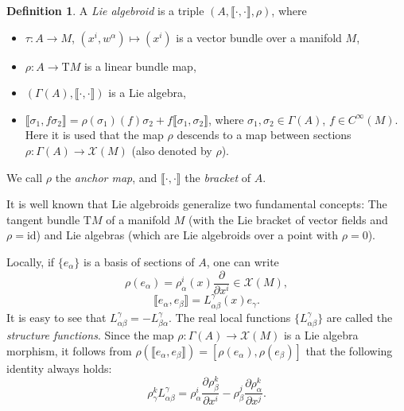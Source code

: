 \documentclass[11pt]{article}
\theoremstyle{plain}
\theoremstyle{definition}
\newtheorem{definition}{Definition}
\begin{document}
\begin{definition}
A \emph{Lie algebroid} is a triple $(A,\llbracket \cdot,\cdot\rrbracket,\rho)$, where
\begin{itemize}
    \item $\tau\colon A\to M$, $(x^i,w^{\alpha})\mapsto (x^i)$ is a vector bundle over a manifold $M$,
    \item $\rho\colon A\to \mathrm{T}M$ is a linear bundle map,
    \item $(\Gamma(A),\llbracket \cdot,\cdot\rrbracket)$ is a Lie algebra,
    \item $\llbracket \sigma_1,f\sigma_2\rrbracket=\rho(\sigma_1)(f)\sigma_2+f\llbracket \sigma_1,\sigma_2\rrbracket$, where $\sigma_1,\sigma_2\in \Gamma(A)$, $f\in C^{\infty}(M)$. Here it is used that the map $\rho$ descends to a map between sections $\rho\colon \Gamma(A)\to \mathcal{X}(M)$ (also denoted by $\rho$).
\end{itemize}
We call $\rho$ the \emph{anchor map}, and $\llbracket \cdot,\cdot\rrbracket$ the \emph{bracket} of $A$.
\end{definition}


It is well known that Lie algebroids generalize two fundamental concepts: The tangent bundle $\mathrm{T}M$ of a manifold $M$ (with the Lie bracket of vector fields and $\rho=\mathrm{id}$) and Lie algebras (which are Lie algebroids over a point with $\rho=0$).

Locally, if $\{e_{\alpha}\}$ is a basis of sections of $A$, one can write
\begin{equation*}
    \rho(e_{\alpha})=\rho_{\alpha}^i(x)\frac{\partial}{\partial x^i}\in \mathcal{X}(M),
\end{equation*}
\begin{equation*}
    \llbracket e_{\alpha},e_{\beta}\rrbracket=L_{\alpha \beta}^{\gamma}(x)e_{\gamma}.
\end{equation*}
It is easy to see that $L_{\alpha \beta}^{\gamma}=-L_{\beta \alpha}^{\gamma}$. The real local functions $\{L_{\alpha \beta}^\gamma\}$ are called the \emph{structure functions}. Since the map $\rho\colon \Gamma(A)\to \mathcal{X}(M)$ is a Lie algebra morphism, it follows from $\rho(\llbracket e_{\alpha},e_{\beta}\rrbracket)=[\rho(e_{\alpha}),\rho(e_{\beta})]$ that the following identity always holds:
\begin{equation}\label{eqn:anchorspecialidentity}
    \rho_{\gamma}^k L_{\alpha \beta}^{\gamma}=\rho_{\alpha}^i \frac{\partial \rho_{\beta}^k}{\partial x^i}-\rho_{\beta}^j \frac{\partial \rho_{\alpha}^k}{\partial x^j}.
\end{equation}
\end{document}
